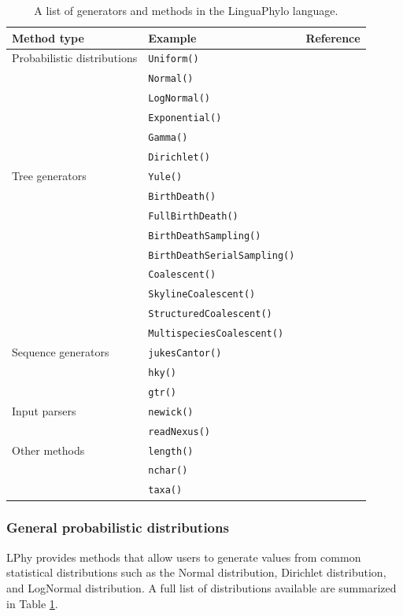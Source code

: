 \documentclass[10pt,letterpaper,table]{article}
\begin{document}
\begin{table}[h]
  \caption{A list of generators and methods in the LinguaPhylo language.}
  \begin{tabular}{|l|l|l|}
    \hline
    Method type & Example & Reference \\\hline
    Probabilistic distributions & \texttt{Uniform()} &\\
              & \texttt{Normal()} &\\
              & \texttt{LogNormal()} &\\
              & \texttt{Exponential()} &\\
              & \texttt{Gamma()} &\\
              & \texttt{Dirichlet()} &\\ \hline
    Tree generators & \texttt{Yule()} & \cite{yule1925ii}\\
              & \texttt{BirthDeath()} &\\
              & \texttt{FullBirthDeath()} &\\
              & \texttt{BirthDeathSampling()} &\\
              & \texttt{BirthDeathSerialSampling()} & \cite{stadler2013dating}\\
              & \texttt{Coalescent()} & \cite{kingman82}\\
              & \texttt{SkylineCoalescent()} & \cite{pybus00,drummond2005bayesiansequences}\\
              & \texttt{StructuredCoalescent()} &\\
              & \texttt{MultispeciesCoalescent()} &\\\hline
    Sequence generators & \texttt{jukesCantor()} & \cite{jc69}\\
              & \texttt{hky()} & \cite{hky}\\
              & \texttt{gtr()} & \cite{gtr}\\ \hline
    Input parsers & \texttt{newick()} &\\
              & \texttt{readNexus()} &\\\hline
    Other methods & \texttt{length()} &\\
    & \texttt{nchar()} &\\
    & \texttt{taxa()} &\\ \hline
  \end{tabular}
  \label{tab:generators}
\end{table}


\subsubsection{General probabilistic distributions}
LPhy provides methods that allow users to generate values from common statistical distributions such as the Normal distribution, Dirichlet distribution, and LogNormal distribution. 
A full list of distributions available are summarized in Table \ref{tab:generators}. 
\end{document}
